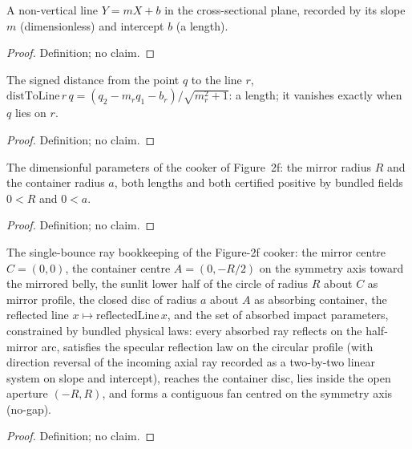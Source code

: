 \begin{definition}
\label{def:IPhO2026Problems_problem_IPhO_2026_2_B_1:Line2D}
A non-vertical line $Y = m X + b$ in the cross-sectional plane, recorded by
its slope $m$ (dimensionless) and intercept $b$ (a length).
\end{definition}
\begin{proof}
Definition; no claim.
\end{proof}

\begin{definition}
\label{def:IPhO2026Problems_problem_IPhO_2026_2_B_1:distToLine}
The signed distance from the point $q$ to the line $r$,
$\mathrm{distToLine}\,r\,q = (q_2 - m_r q_1 - b_r)/\sqrt{m_r^2 + 1}$: a
length; it vanishes exactly when $q$ lies on $r$.
\end{definition}
\begin{proof}
Definition; no claim.
\end{proof}

\begin{definition}
\label{def:IPhO2026Problems_problem_IPhO_2026_2_B_1:CookerParams}
The dimensionful parameters of the cooker of Figure~2f: the mirror radius
$R$ and the container radius $a$, both lengths and both certified positive
by bundled fields $0 < R$ and $0 < a$.
\end{definition}
\begin{proof}
Definition; no claim.
\end{proof}

\begin{definition}
\label{def:IPhO2026Problems_problem_IPhO_2026_2_B_1:CookerB1}
The single-bounce ray bookkeeping of the Figure-2f cooker: the mirror centre
$C = (0,0)$, the container centre $A = (0, -R/2)$ on the symmetry axis toward
the mirrored belly, the sunlit lower half of the circle of radius $R$ about
$C$ as mirror profile, the closed disc of radius $a$ about $A$ as absorbing
container, the reflected line $x \mapsto \mathrm{reflectedLine}\,x$, and the
set of absorbed impact parameters, constrained by bundled physical laws:
every absorbed ray reflects on the half-mirror arc, satisfies the specular
reflection law on the circular profile (with direction reversal of the
incoming axial ray recorded as a two-by-two linear system on slope and
intercept), reaches the container disc, lies inside the open aperture
$(-R, R)$, and forms a contiguous fan centred on the symmetry axis
(no-gap).
\end{definition}
\begin{proof}
Definition; no claim.
\end{proof}

